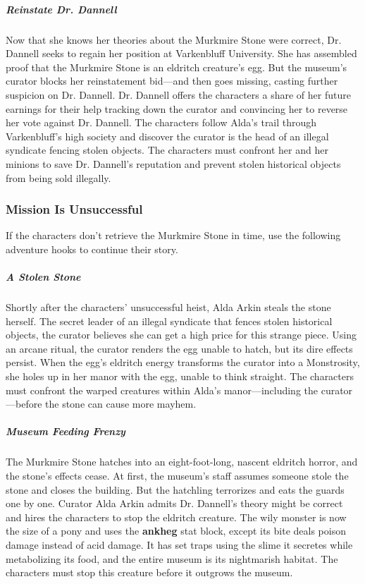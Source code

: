 \documentclass[10pt,a4paper,twoside,bg=print,twocolumn,openany,nodeprecatedcode]{dndbook}
\begin{document}
\subparagraph{Reinstate Dr. Dannell}
Now that she knows her theories about the Murkmire Stone were correct, Dr. Dannell seeks to regain her position at Varkenbluff University. She has assembled proof that the Murkmire Stone is an eldritch creature's egg. But the museum's curator blocks her reinstatement bid—and then goes missing, casting further suspicion on Dr. Dannell. Dr. Dannell offers the characters a share of her future earnings for their help tracking down the curator and convincing her to reverse her vote against Dr. Dannell. The characters follow Alda's trail through Varkenbluff's high society and discover the curator is the head of an illegal syndicate fencing stolen objects. The characters must confront her and her minions to save Dr. Dannell's reputation and prevent stolen historical objects from being sold illegally.

\subsubsection{Mission Is Unsuccessful}
If the characters don't retrieve the Murkmire Stone in time, use the following adventure hooks to continue their story.

\subparagraph{A Stolen Stone}
Shortly after the characters' unsuccessful heist, Alda Arkin steals the stone herself. The secret leader of an illegal syndicate that fences stolen historical objects, the curator believes she can get a high price for this strange piece. Using an arcane ritual, the curator renders the egg unable to hatch, but its dire effects persist. When the egg's eldritch energy transforms the curator into a Monstrosity, she holes up in her manor with the egg, unable to think straight. The characters must confront the warped creatures within Alda's manor—including the curator—before the stone can cause more mayhem.

\subparagraph{Museum Feeding Frenzy}
The Murkmire Stone hatches into an eight-foot-long, nascent eldritch horror, and the stone's effects cease. At first, the museum's staff assumes someone stole the stone and closes the building. But the hatchling terrorizes and eats the guards one by one. Curator Alda Arkin admits Dr. Dannell's theory might be correct and hires the characters to stop the eldritch creature. The wily monster is now the size of a pony and uses the \textbf{ankheg} stat block, except its bite deals poison damage instead of acid damage. It has set traps using the slime it secretes while metabolizing its food, and the entire museum is its nightmarish habitat. The characters must stop this creature before it outgrows the museum.
\end{document}
